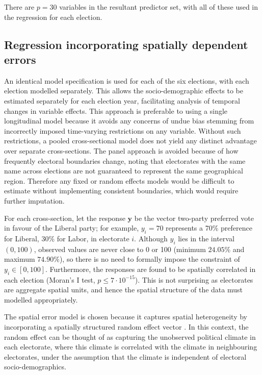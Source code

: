 \documentclass[times, doublespace]{anzsauth}
\begin{document}
There are \(p=30\) variables in the resultant predictor set, with all of these used in the regression for each election.

\hypertarget{regression-incorporating-spatially-dependent-errors}{%
\subsection{Regression incorporating spatially dependent errors}\label{regression-incorporating-spatially-dependent-errors}}

An identical model specification is used for each of the six elections, with each election modelled separately. This allows the socio-demographic effects to be estimated separately for each election year, facilitating analysis of temporal changes in variable effects. This approach is preferable to using a single longitudinal model because it avoids any concerns of undue bias stemming from incorrectly imposed time-varying restrictions on any variable. Without such restrictions, a pooled cross-sectional model does not yield any distinct advantage over separate cross-sections. The panel approach is avoided because of how frequently electoral boundaries change, noting that electorates with the same name across elections are not guaranteed to represent the same geographical region. Therefore any fixed or random effects models would be difficult to estimate without implementing consistent boundaries, which would require further imputation.

For each cross-section, let the response \(\bm{y}\) be the vector two-party preferred vote in favour of the Liberal party; for example, \(y_i = 70\) represents a 70\% preference for Liberal, 30\% for Labor, in electorate \(i\). Although \(y_i\) lies in the interval \((0,100)\), observed values are never close to 0 or 100 (minimum \(24.05 \%\) and maximum \(74.90 \%\)), so there is no need to formally impose the constraint of \(y_i \in [0,100]\). Furthermore, the responses are found to be spatially correlated in each election (Moran's I test, \(p \le 7\cdot10^{-15}\)). This is not surprising as electorates are aggregate spatial units, and hence the spatial structure of the data must modelled appropriately.

The spatial error model \citep{Anselin88} is chosen because it captures spatial heterogeneity by incorporating a spatially structured random effect vector \citep{LeSage2009}. In this context, the random effect can be thought of as capturing the unobserved political climate in each electorate, where this climate is correlated with the climate in neighbouring electorates, under the assumption that the climate is independent of electoral socio-demographics.
\end{document}
